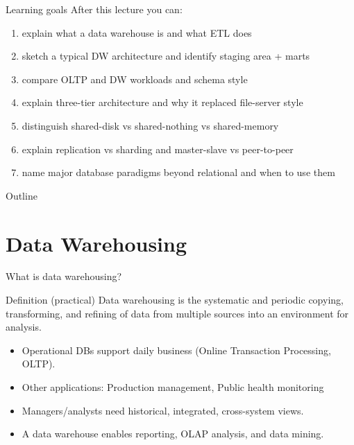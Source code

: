 \documentclass[10pt,aspectratio=169]{beamer}
\begin{document}
\begin{frame}{Learning goals}
After this lecture you can:
\begin{enumerate}
  \item explain what a data warehouse is and what ETL does
  \item sketch a typical DW architecture and identify staging area + marts
  \item compare OLTP and DW workloads and schema style
  \item explain three-tier architecture and why it replaced file-server style
  \item distinguish shared-disk vs shared-nothing vs shared-memory
  \item explain replication vs sharding and master-slave vs peer-to-peer
  \item name major database paradigms beyond relational and when to use them
\end{enumerate}
\end{frame}

\begin{frame}{Outline}
\tableofcontents
\end{frame}

\section{Data Warehousing}

\begin{frame}{What is data warehousing?}
\begin{block}{Definition (practical)}
Data warehousing is the systematic and periodic copying, transforming,
and refining of data from multiple sources into an environment for analysis.
\end{block}
\begin{itemize}
  \item Operational DBs support daily business (Online Transaction Processing, OLTP).
  \item Other applications: Production management, Public health monitoring
  \item Managers/analysts need historical, integrated, cross-system views.
  \item A data warehouse enables reporting, OLAP analysis, and data mining.
\end{itemize}
\end{frame}
\end{document}
